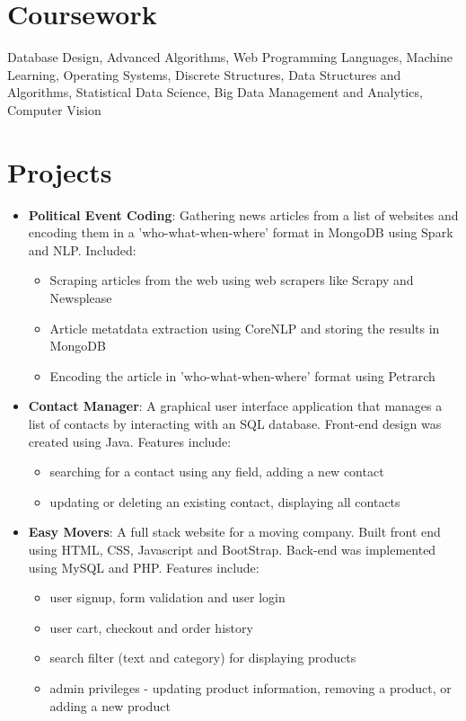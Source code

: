 \documentclass[letterpaper,11pt]{article}
\begin{document}
  
  
    
   \section{Coursework}
Database Design, Advanced Algorithms, Web Programming Languages, Machine Learning, Operating Systems,  Discrete Structures, Data Structures and Algorithms,  Statistical Data Science, Big Data Management and Analytics, Computer Vision
  

  
  \section{Projects}
 \begin{itemize}[noitemsep,nolistsep,leftmargin=*]
 \item \textbf{Political Event Coding}: Gathering news articles from a list of websites and encoding them in a 'who-what-when-where' format in MongoDB using Spark and NLP. Included:
\begin{itemize}[noitemsep,nolistsep,leftmargin=*]
\item Scraping articles from the web using web scrapers like Scrapy and Newsplease
\item Article metatdata extraction using CoreNLP and storing the results in MongoDB
\item Encoding the article in 'who-what-when-where' format using Petrarch
\end{itemize}

\item \textbf{Contact Manager}: A graphical user interface application that manages a list of contacts by interacting with an SQL database. Front-end design was created using Java. Features include:
\begin{itemize}[noitemsep,nolistsep,leftmargin=*]
\item searching for a contact using any field,  adding a new contact
\item  updating or deleting an existing contact, displaying all contacts
\end{itemize}

      
\item \textbf{Easy Movers}: A full stack website for a moving company. Built front end using HTML, CSS, Javascript and BootStrap. Back-end was implemented using MySQL and PHP. Features include:
 \begin{itemize}[noitemsep,nolistsep,leftmargin=*]
 \item  user signup, form validation and user login
 \item user cart, checkout and order history 
 \item search filter (text and category) for displaying products  
 \item admin privileges - updating product information, removing a product, or adding a new product
 \end{itemize}
      

\end{itemize}
\end{document}
